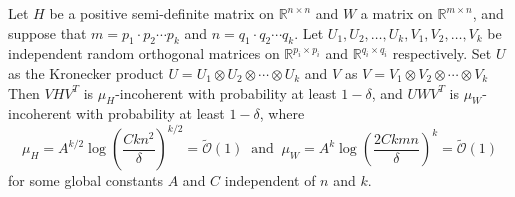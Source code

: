 \begin{lemmarep}\label{lemFastInco}
Let $H$ be a positive semi-definite matrix on $\mathbb{R}^{n \times n}$ and $W$ a matrix on $\mathbb{R}^{m \times n}$, and suppose that $m = p_1 \cdot p_2 \cdots p_k$ and $n = q_1 \cdot q_2 \cdots q_k$. Let $U_1, U_2, \ldots, U_k, V_1, V_2, \ldots, V_k$ be independent random orthogonal matrices on $\mathbb{R}^{p_i \times p_i}$ and $\mathbb{R}^{q_i \times q_i}$ respectively. Set $U$ as the Kronecker product $U = U_1 \otimes U_2 \otimes \cdots \otimes U_k$ and $V$ as $V = V_1 \otimes V_2 \otimes \cdots \otimes V_k$ Then $V H V^T$ is $\mu_H$-incoherent with probability at least $1 - \delta$, and $U W V^T$ is $\mu_W$-incoherent with probability at least $1 - \delta$,
where
\[
    \mu_H
    = A^{k/2} \log\left( \frac{C k n^2}{\delta} \right)^{k/2}
    =
    \tilde{\mathcal{O}}\left( 1 \right)
    \;\;\text{and}\;\;
    \mu_W
    =
    A^k \log\left( \frac{2 C k m n}{\delta} \right)^k
    =
    \tilde{\mathcal{O}}\left( 1 \right)
\]
for some global constants $A$ and $C$ independent of $n$ and $k$.
\end{lemmarep}

